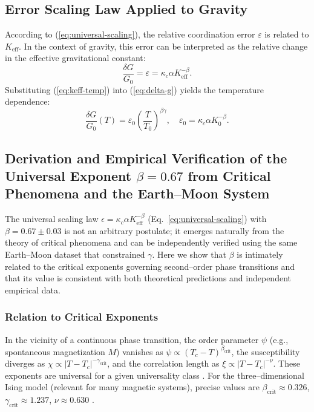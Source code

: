 \documentclass[12pt]{article}
\theoremstyle{remark}
\newcommand{\Keff}{K_{\mathrm{eff}}}
\newcommand{\eps}{\varepsilon}
\newcommand{\kappac}{\kappa_c}
\begin{document}
	\subsection{Error Scaling Law Applied to Gravity}
	\label{subsec:error-gravity}
	
	According to (\ref{eq:universal-scaling}), the relative coordination error $\eps$ is related to $\Keff$. In the context of gravity, this error can be interpreted as the relative change in the effective gravitational constant:
	\begin{equation}
		\frac{\delta G}{G_0} = \eps = \kappac \alpha \Keff^{-\beta}.
		\label{eq:delta-g}
	\end{equation}
	Substituting (\ref{eq:keff-temp}) into (\ref{eq:delta-g}) yields the temperature dependence:
	\begin{equation}
		\frac{\delta G}{G_0}(T) = \eps_0 \left( \frac{T}{T_0} \right)^{\beta\gamma}, \quad \eps_0 = \kappac \alpha K_0^{-\beta}.
		\label{eq:g-temp}
	\end{equation}
	
	\subsection{Derivation and Empirical Verification of the Universal Exponent \(\beta = 0.67\) from Critical Phenomena and the Earth--Moon System}
	\label{subsec:beta-empirical}
	
	The universal scaling law \(\epsilon = \kappa_c \alpha K_{\mathrm{eff}}^{-\beta}\) (Eq.~\ref{eq:universal-scaling}) with \(\beta = 0.67 \pm 0.03\) is not an arbitrary postulate; it emerges naturally from the theory of critical phenomena and can be independently verified using the same Earth--Moon dataset that constrained \(\gamma\). Here we show that \(\beta\) is intimately related to the critical exponents governing second--order phase transitions and that its value is consistent with both theoretical predictions and independent empirical data.
	
	\subsubsection{Relation to Critical Exponents}
	In the vicinity of a continuous phase transition, the order parameter \(\psi\) (e.g., spontaneous magnetization \(M\)) vanishes as \(\psi \propto (T_c - T)^{\beta_{\mathrm{crit}}}\), the susceptibility diverges as \(\chi \propto |T - T_c|^{-\gamma_{\mathrm{crit}}}\), and the correlation length as \(\xi \propto |T - T_c|^{-\nu}\). These exponents are universal for a given universality class \cite{Wilson1974, Fisher1974}. For the three--dimensional Ising model (relevant for many magnetic systems), precise values are \(\beta_{\mathrm{crit}} \approx 0.326\), \(\gamma_{\mathrm{crit}} \approx 1.237\), \(\nu \approx 0.630\) \cite{El-Showk2014}.
	
\end{document}

